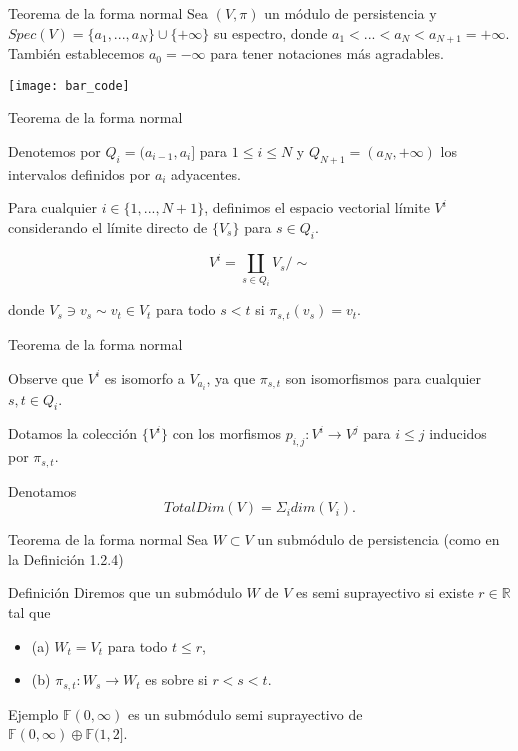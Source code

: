 \documentclass{beamer}
\begin{document}
\begin{frame}{Teorema de la forma normal}
    Sea $(V, \pi)$ un módulo de persistencia y $Spec(V)= \{a_{1},...,a_{N} \}\cup\{+\infty\}$ su espectro, donde $a_1 < ... < a_N < a_{N+1} = +\infty$. También establecemos $a_{0} = -\infty$ para tener notaciones más agradables.
    \pause 
    
    \texttt{[image: bar\_code]}

\end{frame}

\begin{frame}{Teorema de la forma normal}

    Denotemos por $Q_{i} = (a_{i-1}, a_{i}]$ para $1 \leq i \leq N$ y $Q_{N+1} = (a_{N}, + \infty)$ los intervalos definidos por $a_{i}$ adyacentes.
    \pause
     
     Para cualquier $i\in \{1,..., N+1 \}$, definimos el espacio vectorial límite $V^{i}$ considerando el límite directo de $\{ V_{s} \}$ para $s \in Q_{i}$.
     \pause

     $$V^{i}= \coprod_{s\in Q_{i}} V_{s}/\sim$$
    \pause

     donde $V_{s} \ni v_{s} \sim v_{t} \in V_{t}$ para todo $s < t$ si $\pi_{s,t}(v_{s})=v_{t}$.
\end{frame}

\begin{frame}{Teorema de la forma normal}

    Observe que $V^{i}$ es isomorfo a $V_{a_{i}}$, ya que $\pi_{s,t}$ son isomorfismos para cualquier $s,t \in Q_{i}$. 
    \pause

    Dotamos la colección $\{V^{i}\}$ con los morfismos $p_{i,j}:V^{i}\to V^{j}$ para $i\leq j$ inducidos por $\pi_{s,t}$.
    \pause

    Denotamos $$TotalDim(V) = \Sigma_{i} dim(V_{i}).$$

\end{frame}

\begin{frame}{Teorema de la forma normal}
    Sea $W \subset V$ un submódulo de persistencia (como en la Definición 1.2.4)
    \pause 

    \begin{block}{Definición}
        Diremos que un submódulo $W$ de $V$ es semi suprayectivo si existe $r\in\mathbb{R}$ tal que
        \begin{itemize}
            \item (a) $W_t = V_t$ para todo $t \leq r$, 
             \item (b) $\pi_{s,t} : W_s \to W_t$ es sobre  si $r < s < t$.
        \end{itemize}
    \end{block}
    \pause 

     \begin{block}{Ejemplo}
        $\mathbb{F}(0, \infty)$ es un submódulo semi suprayectivo de \\
        $\mathbb{F}(0, \infty) \oplus \mathbb{F}(1, 2]$.
    \end{block}
    \pause 
    
\end{frame}
\end{document}
